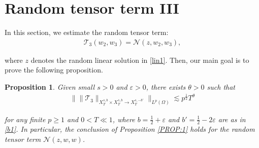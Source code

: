 \documentclass[%
11pt,  reqno]{amsart}
\newtheorem{proposition}[theorem]{Proposition}
\newcommand{\1}{\hspace{0.2mm}\text{I}\hspace{0.2mm}}
\newcommand{\noi}{\noindent}
\newcommand{\eps}{\varepsilon}
\newcommand{\ta}{\theta}
\renewcommand{\O}{\Omega}
\newcommand{\les}{\lesssim}
\newcommand{\NN}{\mathcal{N}}
\numberwithin{equation}{section}
\numberwithin{theorem}{section}
\newcommand{\TT}{\mathcal{T}}
\begin{document}
\section{Random tensor term III}
\label{SEC:RT3}



In this section, we estimate
the  random tensor term:
\begin{align}\label{RB0}
\TT_3(w_2, w_3) =  \NN (z, w_2,w_3), 
\end{align}

\noi
where $z$ denotes the random linear solution in \eqref{lin1}.
Then, our main goal is to prove the following proposition.




\begin{proposition}
\label{PROP:RT3}
Given small   $s > 0$ and $\eps > 0$, 
 there exists $\ta > 0$
such that 
\begin{align*}
\Big\| \| \TT_3 \|_{X^{s,b}_T\times X^{s,b}_T  \to X^{s,-b'}_T} 
\Big\|_{L^p (\O)} 
\les p^\frac 12   T^\ta
\end{align*}

\noi
for any finite $p \ge 1$ and $0 < T\ll 1$, where 
$b = \frac 12 + \eps$ and $b' = \frac 12 - 2\eps$
are as in \eqref{b1}.
In particular, 
 the conclusion of Proposition \ref{PROP:1}
holds
for the random tensor term $\NN(z, w, w)$.




\end{proposition}
\end{document}
